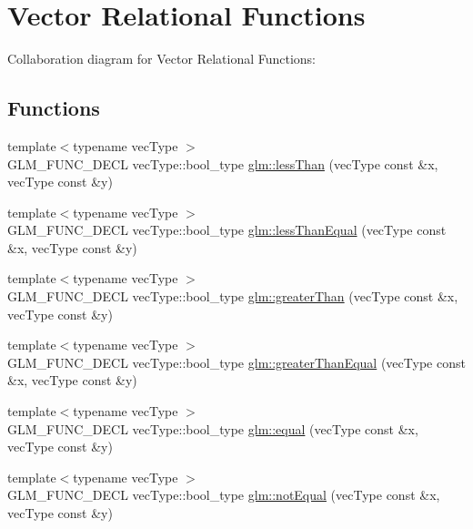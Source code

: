 \hypertarget{group__core__func__vector__relational}{}\section{Vector Relational Functions}
\label{group__core__func__vector__relational}
Collaboration diagram for Vector Relational Functions\+:
\subsection*{Functions}
\begin{DoxyCompactItemize}
\item 
{\footnotesize template$<$typename vec\+Type $>$ }\\G\+L\+M\+\_\+\+F\+U\+N\+C\+\_\+\+D\+E\+C\+L vec\+Type\+::bool\+\_\+type \hyperlink{group__core__func__vector__relational_gafce0126d7f7ed1c7a4be6ace08e1b8de}{glm\+::less\+Than} (vec\+Type const \&x, vec\+Type const \&y)
\item 
{\footnotesize template$<$typename vec\+Type $>$ }\\G\+L\+M\+\_\+\+F\+U\+N\+C\+\_\+\+D\+E\+C\+L vec\+Type\+::bool\+\_\+type \hyperlink{group__core__func__vector__relational_ga740b7a097435c3778e46a6fa00434ef5}{glm\+::less\+Than\+Equal} (vec\+Type const \&x, vec\+Type const \&y)
\item 
{\footnotesize template$<$typename vec\+Type $>$ }\\G\+L\+M\+\_\+\+F\+U\+N\+C\+\_\+\+D\+E\+C\+L vec\+Type\+::bool\+\_\+type \hyperlink{group__core__func__vector__relational_ga3732122bb7bd174db65715f4086cf5b7}{glm\+::greater\+Than} (vec\+Type const \&x, vec\+Type const \&y)
\item 
{\footnotesize template$<$typename vec\+Type $>$ }\\G\+L\+M\+\_\+\+F\+U\+N\+C\+\_\+\+D\+E\+C\+L vec\+Type\+::bool\+\_\+type \hyperlink{group__core__func__vector__relational_ga96bf9a6929aa34321f69133872053d82}{glm\+::greater\+Than\+Equal} (vec\+Type const \&x, vec\+Type const \&y)
\item 
{\footnotesize template$<$typename vec\+Type $>$ }\\G\+L\+M\+\_\+\+F\+U\+N\+C\+\_\+\+D\+E\+C\+L vec\+Type\+::bool\+\_\+type \hyperlink{group__core__func__vector__relational_gacd3085108f3505dd5a67f4f6d3a608c2}{glm\+::equal} (vec\+Type const \&x, vec\+Type const \&y)
\item 
{\footnotesize template$<$typename vec\+Type $>$ }\\G\+L\+M\+\_\+\+F\+U\+N\+C\+\_\+\+D\+E\+C\+L vec\+Type\+::bool\+\_\+type \hyperlink{group__core__func__vector__relational_ga0500603313f784eeeb34250887b112c7}{glm\+::not\+Equal} (vec\+Type const \&x, vec\+Type const \&y)

\end{DoxyCompactItemize}
